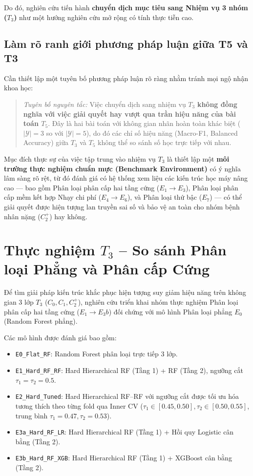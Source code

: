 Do đó, nghiên cứu tiến hành \textbf{chuyển dịch mục tiêu sang Nhiệm vụ 3 nhóm ($T_3$)} như một hướng nghiên cứu mở rộng có tính thực tiễn cao. 

\subsection{Làm rõ ranh giới phương pháp luận giữa T5 và T3}
Cần thiết lập một tuyên bố phương pháp luận rõ ràng nhằm tránh mọi ngộ nhận khoa học:
\begin{quote}
\textit{Tuyên bố nguyên tắc:} Việc chuyển dịch sang nhiệm vụ $T_3$ \textbf{không đồng nghĩa với việc giải quyết hay vượt qua trần hiệu năng của bài toán $T_5$}. Đây là hai bài toán với không gian nhãn hoàn toàn khác biệt ($|\mathcal{Y}| = 3$ so với $|\mathcal{Y}| = 5$), do đó các chỉ số hiệu năng (Macro-F1, Balanced Accuracy) giữa $T_3$ và $T_5$ không thể so sánh số học trực tiếp với nhau.
\end{quote}

Mục đích thực sự của việc tập trung vào nhiệm vụ $T_3$ là thiết lập một \textbf{môi trường thực nghiệm chuẩn mực (Benchmark Environment)} có ý nghĩa lâm sàng rõ rệt, từ đó đánh giá có hệ thống xem liệu các kiến trúc học máy nâng cao — bao gồm Phân loại phân cấp hai tầng cứng ($E_1 \to E_3$), Phân loại phân cấp mềm kết hợp Nhạy chi phí ($E_4 \to E_6$), và Phân loại thứ bậc ($E_7$) — có thể giải quyết được hiện tượng lan truyền sai số và bảo vệ an toàn cho nhóm bệnh nhân nặng ($C_2^+$) hay không.

\FloatBarrier
\section{Thực nghiệm $T_3$ – So sánh Phân loại Phẳng và Phân cấp Cứng}
\label{sec:thuc-nghiem-t3-hard}

Để tìm giải pháp kiến trúc khắc phục hiện tượng suy giảm hiệu năng trên không gian 3 lớp $T_3$ ($C_0, C_1, C_2^+$), nghiên cứu triển khai nhóm thực nghiệm Phân loại phân cấp hai tầng cứng ($E_1 \to E_3b$) đối chứng với mô hình Phân loại phẳng $E_0$ (Random Forest phẳng).

Các mô hình được đánh giá bao gồm:
\begin{itemize}
    \item \texttt{E0\_Flat\_RF}: Random Forest phân loại trực tiếp 3 lớp.
    \item \texttt{E1\_Hard\_RF\_RF}: Hard Hierarchical RF (Tầng 1) + RF (Tầng 2), ngưỡng cắt $\tau_1 = \tau_2 = 0.5$.
    \item \texttt{E2\_Hard\_Tuned}: Hard Hierarchical RF--RF với ngưỡng cắt được tối ưu hóa tương thích theo từng fold qua Inner CV ($\tau_1 \in [0.45, 0.50], \tau_2 \in [0.50, 0.55]$, trung bình $\tau_1 = 0.47, \tau_2 = 0.53$).
    \item \texttt{E3a\_Hard\_RF\_LR}: Hard Hierarchical RF (Tầng 1) + Hồi quy Logistic cân bằng (Tầng 2).
    \item \texttt{E3b\_Hard\_RF\_XGB}: Hard Hierarchical RF (Tầng 1) + XGBoost cân bằng (Tầng 2).
\end{itemize}

